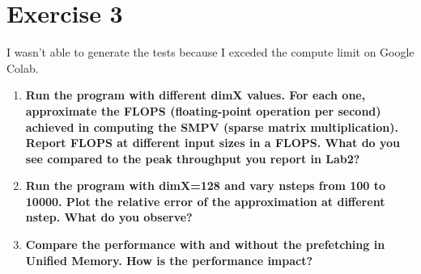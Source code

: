 \documentclass[a4paper,11pt]{scrartcl}
\begin{document}
\section*{Exercise 3}

I wasn't able to generate the tests because I exceded the compute limit on Google Colab.

\begin{enumerate}

    \item \textbf{Run the program with different dimX values. For each one, approximate the FLOPS (floating-point operation per second) achieved in computing the SMPV (sparse matrix multiplication). Report FLOPS at different input sizes in a FLOPS. What do you see compared to the peak throughput you report in Lab2?}

    \item \textbf{Run the program with dimX=128 and vary nsteps from 100 to 10000. Plot the relative error of the approximation at different nstep. What do you observe?}

    \item \textbf{Compare the performance with and without the prefetching in Unified Memory. How is the performance impact?}

\end{enumerate}
\end{document}

